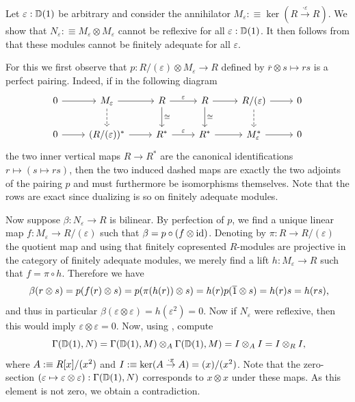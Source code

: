 \begin{counterexample}\label{cex:tensor-not-closed}
  Let $\varepsilon : \mathbb{D}(1)$ be arbitrary and consider the annihilator $M_\varepsilon :\equiv \ker(R\overset{\cdot \varepsilon}{\to}R)$.
  We show that $N_\varepsilon :\equiv M_\varepsilon \otimes M_\varepsilon$ cannot be reflexive for all $\varepsilon : \mathbb{D}(1)$.
  It then follows from  that these modules cannot be finitely adequate for all $\varepsilon$.

  For this we first observe that $p : R/(\varepsilon) \otimes M_\varepsilon \to R$ defined by $\overline{r} \otimes s \mapsto rs$ is a perfect pairing.
  Indeed, if in the following diagram
  \[
  \begin{tikzcd}
    0 \ar[r] & M_\varepsilon \ar[r]\ar[d, dashed]
             & R \ar[r, "\varepsilon"]\ar[d, "\cong"]
             & R \ar[r]\ar[d, "\cong"]
             & R/(\varepsilon) \ar[r]\ar[d, dashed]
             & 0 \\
    0 \ar[r] & (R/(\varepsilon))^\ast \ar[r]
             & R^\ast \ar[r, "\varepsilon"]
             & R^\ast \ar[r]
             & M_\varepsilon^\ast \ar[r]
             & 0
  \end{tikzcd}
  \]
  the two inner vertical maps $R \to R^\ast$ are the canonical identifications $r \mapsto (s \mapsto rs)$, then the two induced dashed maps are exactly the two adjoints of the pairing $p$ and must furthermore be isomorphisms themselves.
  Note that the rows are exact since dualizing is so on finitely adequate modules.

  Now suppose $\beta: N_\varepsilon \to R$ is bilinear.
  By perfection of $p$, we find a unique linear map $f : M_\varepsilon \to R/(\varepsilon)$ such that $\beta = p \circ (f \otimes \mathrm{id})$.
  Denoting by $\pi : R \to R/(\varepsilon)$ the quotient map and using that finitely copresented $R$-modules are projective in the category of finitely adequate modules, we merely find a lift $h : M_\varepsilon \to R$ such that $f = \pi \circ h$.
  Therefore we have
  \[
    \beta(r \otimes s) = p(f(r) \otimes s)
                       = p(\pi(h(r)) \otimes s)
                       = h(r) p(\overline{1} \otimes s)
                       = h(r)s
                       = h(rs) \rlap{,}
  \]
  and thus in particular $\beta( \varepsilon \otimes \varepsilon) = h(\varepsilon^2) = 0$.
  Now if $N_\varepsilon$ were reflexive, then this would imply $\varepsilon \otimes \varepsilon = 0$.
  Now, using , compute
  \[
    \Gamma(\D(1),N) = \Gamma(\D(1),M) \otimes_A \Gamma(\D(1),M) = I \otimes_A I = I \otimes_R I \rlap{,}
  \]
  where $A :\equiv R[x]/(x^2)$ and $I :\equiv \ker(A \overset{\cdot x}{\to} A) = (x)/(x^2)$.
  Note that the zero-section $(\varepsilon \mapsto \varepsilon \otimes \varepsilon) : \Gamma(\mathbb{D}(1),N)$ corresponds to $x \otimes x$ under these maps.
  As this element is not zero, we obtain a contradiction.
\end{counterexample}

